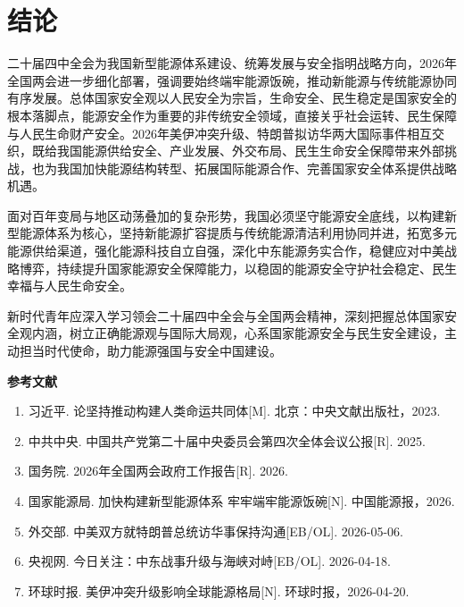 \documentclass[12pt,a4paper,UTF8]{article}
\begin{document}
\section{结论}
二十届四中全会为我国新型能源体系建设、统筹发展与安全指明战略方向，2026年全国两会进一步细化部署，强调要始终端牢能源饭碗，推动新能源与传统能源协同有序发展。总体国家安全观以人民安全为宗旨，生命安全、民生稳定是国家安全的根本落脚点，能源安全作为重要的非传统安全领域，直接关乎社会运转、民生保障与人民生命财产安全。2026年美伊冲突升级、特朗普拟访华两大国际事件相互交织，既给我国能源供给安全、产业发展、外交布局、民生生命安全保障带来外部挑战，也为我国加快能源结构转型、拓展国际能源合作、完善国家安全体系提供战略机遇。

面对百年变局与地区动荡叠加的复杂形势，我国必须坚守能源安全底线，以构建新型能源体系为核心，坚持新能源扩容提质与传统能源清洁利用协同并进，拓宽多元能源供给渠道，强化能源科技自立自强，深化中东能源务实合作，稳健应对中美战略博弈，持续提升国家能源安全保障能力，以稳固的能源安全守护社会稳定、民生幸福与人民生命安全。

新时代青年应深入学习领会二十届四中全会与全国两会精神，深刻把握总体国家安全观内涵，树立正确能源观与国际大局观，心系国家能源安全与民生安全建设，主动担当时代使命，助力能源强国与安全中国建设。

\newpage
\begin{center}
    \bfseries{} 参考文献
\end{center}
\vspace{0.5cm}
\begin{enumerate}
    \item 习近平. 论坚持推动构建人类命运共同体[M]. 北京：中央文献出版社，2023.
    \item 中共中央. 中国共产党第二十届中央委员会第四次全体会议公报[R]. 2025.
    \item 国务院. 2026年全国两会政府工作报告[R]. 2026.
    \item 国家能源局. 加快构建新型能源体系 牢牢端牢能源饭碗[N]. 中国能源报，2026.
    \item 外交部. 中美双方就特朗普总统访华事保持沟通[EB/OL]. 2026-05-06.
    \item 央视网. 今日关注：中东战事升级与海峡对峙[EB/OL]. 2026-04-18.
    \item 环球时报. 美伊冲突升级影响全球能源格局[N]. 环球时报，2026-04-20.
\end{enumerate}
\end{document}
